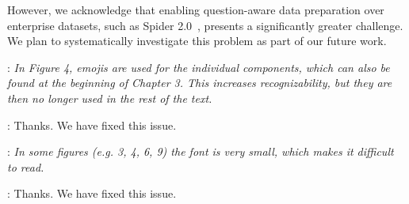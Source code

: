 However, we acknowledge that enabling question-aware data preparation over enterprise datasets, such as Spider 2.0~\cite{lei2024spider2}, presents a significantly greater challenge. We plan to systematically investigate this problem as part of our future work.




\begin{shaded}
{

: 
\emph{In Figure 4, emojis are used for the individual components, which can also be found at the beginning of Chapter 3. This increases recognizability, but they are then no longer used in the rest of the text.}
}
\end{shaded}

: 
Thanks. We have fixed this issue.


\begin{shaded}
{

: 
\emph{
In some figures (e.g. 3, 4, 6, 9) the font is very small, which makes it difficult to read.}
}
\end{shaded}

: Thanks. We have fixed this issue.


